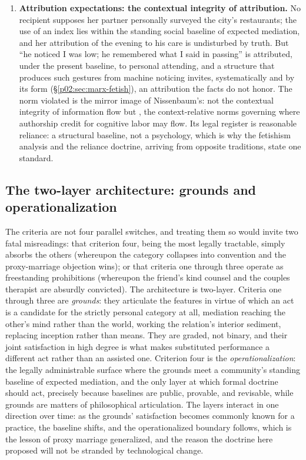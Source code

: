 \begin{enumerate}[leftmargin=2em, itemsep=0.35em]
\item \textbf{Attribution expectations: the contextual integrity of attribution.} No recipient supposes her partner personally surveyed the city's restaurants; the use of an index lies within the standing social baseline of expected mediation, and her attribution of the evening to his care is undisturbed by truth. But ``he noticed I was low; he remembered what I said in passing'' is attributed, under the present baseline, to personal attending, and a structure that produces such gestures from machine noticing invites, systematically and by its form (\S\ref{p02:sec:marx-fetish}), an attribution the facts do not honor. The norm violated is the mirror image of Nissenbaum's: not the contextual integrity of information flow but , the context-relative norms governing where authorship credit for cognitive labor may flow. Its legal register is reasonable reliance: a structural baseline, not a psychology, which is why the fetishism analysis and the reliance doctrine, arriving from opposite traditions, state one standard.
\end{enumerate}

\subsection{The two-layer architecture: grounds and operationalization}
\label{p02:sec:synthesis-architecture}

The criteria are not four parallel switches, and treating them so would invite two fatal misreadings: that criterion four, being the most legally tractable, simply absorbs the others (whereupon the category collapses into convention and the proxy-marriage objection wins); or that criteria one through three operate as freestanding prohibitions (whereupon the friend's kind counsel and the couples therapist are absurdly convicted). The architecture is two-layer. Criteria one through three are \emph{grounds}: they articulate the features in virtue of which an act is a candidate for the strictly personal category at all, mediation reaching the other's mind rather than the world, working the relation's interior sediment, replacing inception rather than means. They are graded, not binary, and their joint satisfaction in high degree is what makes substituted performance a different act rather than an assisted one. Criterion four is the \emph{operationalization}: the legally administrable surface where the grounds meet a community's standing baseline of expected mediation, and the only layer at which formal doctrine should act, precisely because baselines are public, provable, and revisable, while grounds are matters of philosophical articulation. The layers interact in one direction over time: as the grounds' satisfaction becomes commonly known for a practice, the baseline shifts, and the operationalized boundary follows, which is the lesson of proxy marriage generalized, and the reason the doctrine here proposed will not be stranded by technological change.

